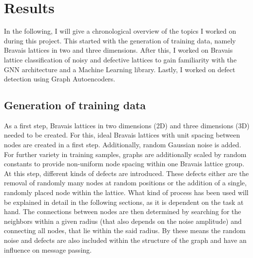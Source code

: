 \documentclass[11pt,a4paper]{article}
\begin{document}
\section{Results}
\label{sec:Results}
In the following, I will give a chronological overview of the topics I worked on during this project. 
This started with the generation of training data, namely Bravais lattices in two and three dimensions. After this, I worked on Bravais lattice classification of noisy and defective lattices to gain familiarity with the GNN architecture and a Machine Learning library. Lastly, I worked on defect detection using Graph Autoencoders. 

\subsection{Generation of training data}
\label{ssec:Generation of training data}
As a first step, Bravais lattices in two dimensions (2D) and three dimensions (3D) needed to be created. 
For this, ideal Bravais lattices with unit spacing between nodes are created in a first step. 
Additionally, random Gaussian noise is added. 
For further variety in training samples, graphs are additionally scaled by random constants to provide non-uniform node spacing within one Bravais lattice group. 
At this step, different kinds of defects are introduced. 
These defects either are the removal of randomly many nodes at random positions or the addition of a single, randomly placed node within the lattice. 
What kind of process has been used will be explained in detail in the following sections, as it is dependent on the task at hand. 
The connections between nodes are then determined by searching for the neighbors within a given radius (that also depends on the noise amplitude) and connecting all nodes, that lie within the said radius. 
By these means the random noise and defects are also included within the structure of the graph and have an influence on message passing. \\
\end{document}

